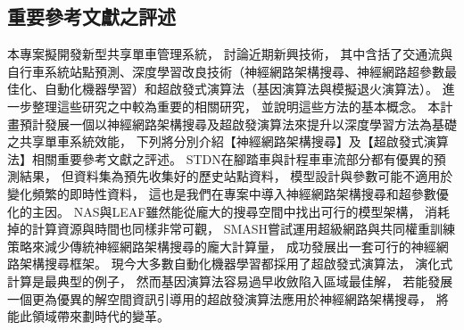 \documentclass[a4paper,12pt]{extarticle}
\begin{document}
        \subsection{重要參考文獻之評述}
            本專案擬開發新型共享單車管理系統，
            討論近期新興技術，
            其中含括了交通流與自行車系統站點預測、深度學習改良技術（神經網路架構搜尋、神經網路超參數最佳化、自動化機器學習）和超啟發式演算法（基因演算法與模擬退火演算法）。
            進一步整理這些研究之中較為重要的相關研究，
            並說明這些方法的基本概念。
            本計畫預計發展一個以神經網路架構搜尋及超啟發演算法來提升以深度學習方法為基礎之共享單車系統效能，
            下列將分別介紹【神經網路架構搜尋】及【超啟發式演算法】相關重要參考文獻之評述。
            STDN\cite{yao2019revisiting}在腳踏車與計程車車流部分都有優異的預測結果，
            但資料集為預先收集好的歷史站點資料，
            模型設計與參數可能不適用於變化頻繁的即時性資料，
            這也是我們在專案中導入神經網路架構搜尋和超參數優化的主因。
            NAS\cite{zoph2016neural}與LEAF\cite{10.1145/3321707.3321721}雖然能從龐大的搜尋空間中找出可行的模型架構，
            消耗掉的計算資源與時間也同樣非常可觀，
            SMASH\cite{brock2017smash}嘗試運用超級網路與共同權重訓練策略來減少傳統神經網路架構搜尋的龐大計算量，
            成功發展出一套可行的神經網路架構搜尋框架。
            現今大多數自動化機器學習都採用了超啟發式演算法，
            演化式計算是最典型的例子，
            然而基因演算法容易過早收斂陷入區域最佳解，
            若能發展一個更為優異的解空間資訊引導用的超啟發演算法應用於神經網路架構搜尋，
            將能此領域帶來劃時代的變革。
\end{document}
